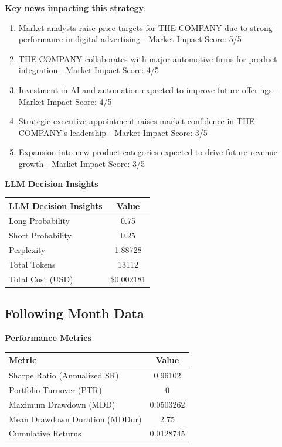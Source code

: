 \documentclass[8pt]{scrartcl}
\begin{document}
\textbf{Key news impacting this strategy}:
\begin{enumerate}
    \item Market analysts raise price targets for THE COMPANY due to strong performance in digital advertising - Market Impact Score: 5/5
    \item THE COMPANY collaborates with major automotive firms for product integration - Market Impact Score: 4/5
    \item Investment in AI and automation expected to improve future offerings - Market Impact Score: 4/5
    \item Strategic executive appointment raises market confidence in THE COMPANY’s leadership - Market Impact Score: 3/5
    \item Expansion into new product categories expected to drive future revenue growth - Market Impact Score: 3/5
\end{enumerate}

\textbf{LLM Decision Insights}

\begin{longtable}{l c}
\toprule
\textbf{LLM Decision Insights} & \textbf{Value} \\
\midrule
Long Probability & 0.75 \\
Short Probability & 0.25 \\
Perplexity & 1.88728   \\
\midrule
Total Tokens & 13112 \\
Total Cost (USD) & \$0.002181 \\
\bottomrule
\end{longtable}

\subsection*{Following Month Data}

\textbf{Performance Metrics}

\begin{longtable}{l c}
\toprule
\textbf{Metric} & \textbf{Value} \\
\midrule
Sharpe Ratio (Annualized SR) & 0.96102 \\
Portfolio Turnover (PTR) & 0 \\
Maximum Drawdown (MDD) & 0.0503262 \\
Mean Drawdown Duration (MDDur) & 2.75 \\
Cumulative Returns & 0.0128745 \\
\bottomrule
\end{longtable}
\end{document}
